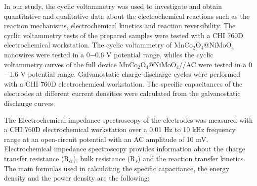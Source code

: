 \documentclass[reprint,amsmath,amssymb,aps,floatfix,
]{revtex4-2}
\begin{document}
In our study, the cyclic voltammetry was used to investigate and obtain quantitative and qualitative data about the electrochemical reactions such as the reaction mechanisms, electrochemical kinetics and reaction reversibility. The cyclic voltammetry tests of the prepared samples were tested with a CHI 760D electrochemical workstation. The cyclic voltammetry of MnCo$_2$O$_4$@NiMoO$_4$ nanowires were tested in a 0$-$0.6 V potential range, whiles the cyclic voltammetry curves of the full device MnCo$_2$O$_4$@NiMoO$_4$//AC were tested in a 0$-$1.6 V potential range. Galvanostatic charge-discharge cycles were performed with a CHI 760D electrochemical workstation. The specific capacitances of the electrodes at different current densities were calculated from the galvanostatic discharge curves.

The Electrochemical impedance spectroscopy of the electrodes was measured with a CHI 760D electrochemical workstation over a 0.01 Hz to 10 kHz frequency range at an open-circuit potential with an AC amplitude of 10 mV. Electrochemical impedance spectroscopy provides information about the charge transfer resistance (R$_{ct}$), bulk resistance (R$_s$) and the reaction transfer kinetics. The main formulas used in calculating the specific capacitance, the energy density and the power density are the following:
\end{document}
